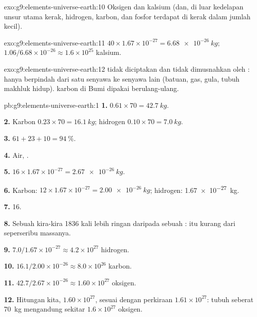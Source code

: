 \begin{solution}{exo:g9:elements-universe-earth:10}
Oksigen dan kalsium (dan, di luar kedelapan unsur utama kerak, hidrogen,
karbon, dan fosfor terdapat di kerak dalam jumlah kecil).
\end{solution}

\begin{solution}{exo:g9:elements-universe-earth:11}
$40 \times 1.67 \times 10^{-27} = \qty{6.68e-26}{kg}$;
$1.06 / 6.68 \times 10^{-26} \approx 1.6 \times 10^{25}$  kalsium.
\end{solution}

\begin{solution}{exo:g9:elements-universe-earth:12}
 tidak diciptakan dan tidak dimusnahkan oleh : 
hanya berpindah dari satu senyawa ke senyawa lain (batuan, gas, gula,
tubuh makhluk hidup).  karbon di Bumi dipakai berulang-ulang.
\end{solution}

\begin{solution}{pb:g9:elements-universe-earth:1}
\textbf{1.} $0.61 \times 70 = \qty{42.7}{kg}$.

\textbf{2.} Karbon $0.23 \times 70 = \qty{16.1}{kg}$; hidrogen
$0.10 \times 70 = \qty{7.0}{kg}$.

\textbf{3.} $61 + 23 + 10 = \qty{94}{\percent}$.

\textbf{4.} Air, .

\textbf{5.} $16 \times 1.67 \times 10^{-27} = \qty{2.67e-26}{kg}$.

\textbf{6.} Karbon: $12 \times 1.67 \times 10^{-27} = \qty{2.00e-26}{kg}$;
hidrogen: \qty{1.67e-27}{kg}.

\textbf{7.} 16.

\textbf{8.} Sebuah  kira-kira 1836 kali lebih ringan daripada
sebuah :  itu kurang dari seperseribu massanya.

\textbf{9.} $7.0 / 1.67 \times 10^{-27} \approx 4.2 \times 10^{27}$
 hidrogen.

\textbf{10.} $16.1 / 2.00 \times 10^{-26} \approx 8.0 \times 10^{26}$
 karbon.

\textbf{11.} $42.7 / 2.67 \times 10^{-26} \approx 1.60 \times 10^{27}$
 oksigen.

\textbf{12.} Hitungan kita, $1.60 \times 10^{27}$, sesuai dengan
perkiraan $1.61 \times 10^{27}$: tubuh seberat \qty{70}{kg} mengandung
sekitar $1.6 \times
10^{27}$  oksigen.
\end{solution}
